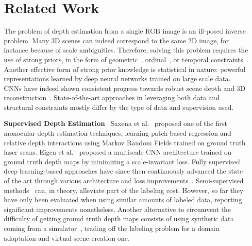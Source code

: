 \documentclass[letterpaper, 10 pt, conference]{ieeeconf}  \IEEEoverridecommandlockouts
\begin{document}
 \section{Related Work}
\label{sec:related-work}

The problem of depth estimation from a single RGB image is an ill-posed inverse problem. Many 3D scenes can indeed correspond to the same 2D image, for instance because of scale ambiguities.
Therefore, solving this problem requires the use of strong priors, in the form of geometric~\cite{godard2017unsupervised,zhou2017unsupervised,yang2018deep}, ordinal~\cite{fu2018deep}, or temporal constraints~\cite{godard2018digging,zhou2017unsupervised,mahjourian2018unsupervised}.
Another effective form of strong prior knowledge is statistical in nature: powerful representations learned by deep neural networks trained on large scale data. CNNs have indeed shown consistent progress towards robust scene depth and 3D reconstruction~\cite{yang2018deep,bloesch2018codeslam,zhoudeeptam2018}. State-of-the-art approaches in leveraging both data and structural constraints mostly differ by the type of data and supervision used.




\textbf{Supervised Depth Estimation}~
Saxena et al.~\cite{saxena2009make3d} proposed one of the first monocular depth estimation techniques, learning patch-based regression and relative depth interactions using Markov Random Fields trained on ground truth laser scans.
Eigen et al.~\cite{eigen2014depth} proposed a multiscale CNN architecture trained on ground truth depth maps by minimizing a scale-invariant loss.
Fully supervised deep learning-based approaches have since  then continuously advanced the state of the art through various architecture and loss improvements~\cite{mayer2016large,zbontar2015computing,ummenhofer2017demon,kendall2017end}.
Semi-supervised methods~\cite{kuznietsov2017semi,yang2018deep} can, in theory, alleviate part of the labeling cost. However, so far they have only been evaluated when using similar amounts of labeled data, reporting significant improvements nonetheless.
Another alternative to circumvent the difficulty of getting ground truth depth maps consists of using synthetic data coming from a simulator~\cite{mayer2018what}, trading off the labeling problem for a domain adaptation and virtual scene creation one.
\end{document}
